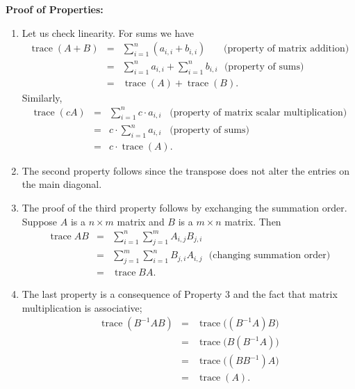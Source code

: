 \documentclass[12pt]{article}
\begin{document}
\textbf{Proof of Properties:}
\begin{enumerate}
\item Let us check linearity. For sums we have
\begin{eqnarray*}
\operatorname{trace}(A+B) &=& \sum\limits_{i=1}^{n} (a_{i,i} + b_{i,i})\,\,\,\,\,\,\,\,\,\,\, \mbox{(property of matrix addition)}\\
&=&\sum\limits _{i=1} ^{n} a_{i,i} + \sum\limits _{i=1} ^{n} b_{i,i}\,\,\,\, \mbox{(property of sums)} \\
&=&\operatorname{trace}(A) + \operatorname{trace}(B).
\end{eqnarray*}
Similarly,
\begin{eqnarray*}
\operatorname{trace}(cA) &=& \sum\limits _{i=1} ^{n} c\cdot a_{i,i}\,\,\,\,\, \mbox{(property of matrix scalar multiplication)} \\
&=& c\cdot \sum\limits _{i=1} ^{n} a_{i,i}\,\,\,\,\, \mbox{(property of sums)} \\
&=& c\cdot \operatorname{trace}(A).
\end{eqnarray*}
\item The second property follows since the transpose does not alter
the entries on the main diagonal.
\item The proof of the third property follows by exchanging the
summation order. Suppose $A$ is a $n\times m$ matrix and $B$ is a $m\times n$ matrix.
Then
\begin{eqnarray*}
\operatorname{trace} AB &=& \sum\limits_{i=1}^{n} \sum\limits_{j=1}^{m} A_{i,j} B_{j,i} \\
&=& \sum\limits_{j=1}^{m} \sum\limits_{i=1}^{n} B_{j,i} A_{i,j} \,\,\,\,\mbox{(changing summation order)}\\
&=& \operatorname{trace} BA.
\end{eqnarray*}
\item The last property is a consequence of Property 3 and the fact that matrix multiplication is
associative;
\begin{eqnarray*}
\operatorname{trace} (B^{-1} A B) &=& \operatorname{trace} \big((B^{-1} A) B\big) \\
&=& \operatorname{trace} \big(B(B^{-1} A) \big) \\
&=& \operatorname{trace} \big( (BB^{-1}) A \big) \\
&=& \operatorname{trace} (A).
\end{eqnarray*}

\end{enumerate}
\end{document}
